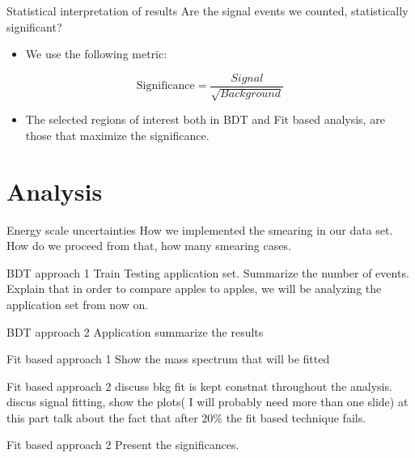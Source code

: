\documentclass[bigger]{beamer}
\begin{document}
\begin{frame}[label={sec:org51c3761}]{Statistical interpretation of results}
\alert{Are the signal events we counted, statistically significant?}
\begin{itemize}
\item We use the following metric:
\end{itemize}
\begin{equation}
\text{Significance} = \frac{Signal}{\sqrt{Background}}
\end{equation}
\begin{itemize}
\item The selected regions of interest both in BDT and Fit based analysis, are those that maximize the significance.
\end{itemize}
\end{frame}

\section{Analysis}
\label{sec:org05ae1c6}
\begin{frame}[label={sec:orgd974eb2}]{Energy scale uncertainties}
How we implemented the smearing in our data set. How do we proceed from that, how many smearing cases. 
\end{frame}
\begin{frame}[label={sec:org009670c}]{BDT approach 1}
Train Testing application set. Summarize the number of events. Explain that in order to compare apples to apples, we will be analyzing the application set from now on.
\end{frame}
\begin{frame}[label={sec:orgbc17049}]{BDT approach 2}
Application summarize the results 
\end{frame}
\begin{frame}[label={sec:org35b9f4a}]{Fit based approach 1}
Show the mass spectrum that will be fitted 
\end{frame}
\begin{frame}[label={sec:orge0b214a}]{Fit based approach 2}
discuss bkg fit is kept constnat throughout the analysis. discus signal fitting, show the plots( I will probably need more than one slide) at this part talk about the fact that after \(20\%\) the fit based technique fails. 
\end{frame}
\begin{frame}[label={sec:org311865b}]{Fit based approach 2}
Present the significances.
\end{frame}
\end{document}
